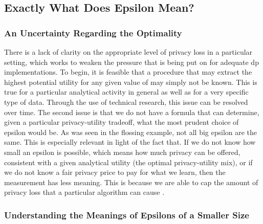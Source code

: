 \subsection{Exactly What Does Epsilon Mean?}

\subsubsection{An Uncertainty Regarding the Optimality}

There is a lack of clarity on the appropriate level of privacy loss in a particular setting, which works to weaken the pressure that is being put on for adequate \acrshort{dp} implementations. To begin, it is feasible that a procedure that may extract the highest potential utility for any given value of may simply not be known. This is true for a particular analytical activity in general as well as for a very specific type of data. Through the use of technical research, this issue can be resolved over time. The second issue is that we do not have a formula that can determine, given a particular privacy-utility tradeoff, what the most prudent choice of epsilon would be. As was seen in the flossing example, not all big epsilon are the same. This is especially relevant in light of the fact that.
If we do not know how small an epsilon is possible, which means how much privacy can be offered, consistent with a given analytical utility (the optimal privacy-utility mix), or if we do not know a fair privacy price to pay for what we learn, then the measurement has less meaning. This is because we are able to cap the amount of privacy loss that a particular algorithm can cause \cite{DWORK2019}.

\subsubsection{Understanding the Meanings of Epsilons of a Smaller Size}

